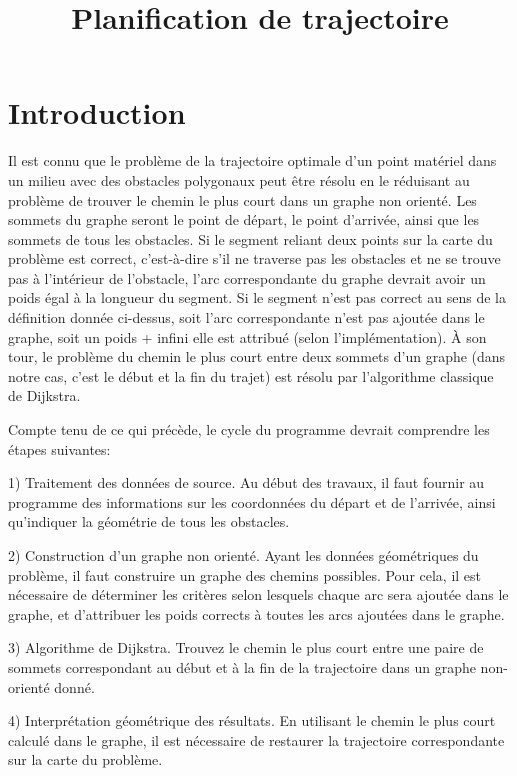 \documentclass[12pt]{article}
\begin{document}
	
	\tableofcontents
	\title{Planification de trajectoire}
	\maketitle
	\section{Introduction}
	
	Il est connu que le problème de la trajectoire optimale d'un point matériel dans un milieu avec des obstacles polygonaux peut être résolu en le réduisant au problème de trouver le chemin le plus court dans un graphe non orienté. Les sommets du graphe seront le point de départ, le point d'arrivée, ainsi que les sommets de tous les obstacles. Si le segment reliant deux points sur la carte du problème est correct, c'est-à-dire s'il ne traverse pas les obstacles et ne se trouve pas à l'intérieur de l'obstacle, l’arc correspondante du graphe devrait avoir un poids égal à la longueur du segment. Si le segment n'est pas correct au sens de la définition donnée ci-dessus, soit l’arc correspondante n'est pas ajoutée dans le graphe, soit un poids + infini elle est attribué (selon l'implémentation). À son tour, le problème du chemin le plus court entre deux sommets d'un graphe (dans notre cas, c'est le début et la fin du trajet) est résolu par l'algorithme classique de Dijkstra.
	
	Compte tenu de ce qui précède, le cycle du programme devrait comprendre les étapes suivantes:
	
	1) Traitement des données de source. Au début des travaux, il faut fournir au programme des informations sur les coordonnées du départ et de l'arrivée, ainsi qu'indiquer la géométrie de tous les obstacles.
	
	2) Construction d'un graphe non orienté. Ayant les données géométriques du problème, il faut construire un graphe des chemins possibles. Pour cela, il est nécessaire de déterminer les critères selon lesquels chaque arc sera ajoutée dans le graphe, et d'attribuer les poids corrects à toutes les arcs ajoutées dans le graphe.
	
	3) Algorithme de Dijkstra. Trouvez le chemin le plus court entre une paire de sommets correspondant au début et à la fin de la trajectoire dans un graphe non-orienté donné.
	
	4) Interprétation géométrique des résultats. En utilisant le chemin le plus court calculé dans le graphe, il est nécessaire de restaurer la trajectoire correspondante sur la carte du problème.
	
\end{document}

